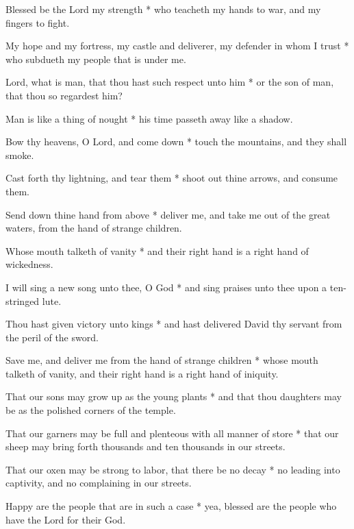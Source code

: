 \begin{multicols}{2}
	
	Blessed be the Lord my strength * who teacheth my hands to war, and my fingers to fight.
	
	My hope and my fortress, my castle and deliverer, my defender in whom I trust * who subdueth my people that is under me.
	
	Lord, what is man, that thou hast such respect unto him * or the son of man, that thou so regardest him?
	
	Man is like a thing of nought * his time passeth away like a shadow.
	
	Bow thy heavens, O Lord, and come down * touch the mountains, and they shall smoke.
	
	Cast forth thy lightning, and tear them * shoot out thine arrows, and consume them.
	
	Send down thine hand from above * deliver me, and take me out of the great waters, from the hand of strange children.
	
	Whose mouth talketh of vanity * and their right hand is a right hand of wickedness.
	
	I will sing a new song unto thee, O God * and sing praises unto thee upon a ten-stringed lute.
	
	Thou hast given victory unto kings * and hast delivered David thy servant from the peril of the sword.
	
	Save me, and deliver me from the hand of strange children * whose mouth talketh of vanity, and their right hand is a right hand of iniquity.
	
	That our sons may grow up as the young plants * and that thou daughters may be as the polished corners of the temple.
	
	That our garners may be full and plenteous with all manner of store * that our sheep may bring forth thousands and ten thousands in our streets.
	
	That our oxen may be strong to labor, that there be no decay * no leading into captivity, and no complaining in our streets.
	
	Happy are the people that are in such a case * yea, blessed are the people who have the Lord for their God.
	
	\gloria{}
\end{multicols}